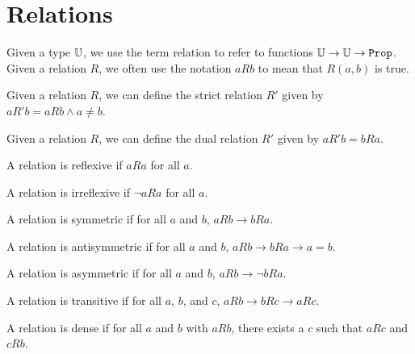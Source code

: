 \documentclass[../math.tex]{subfiles}
\begin{document}
\section{Relations}

\begin{definition}
    Given a type $\mathbb{U}$, we use the term relation to refer to functions $\U
    \rightarrow \U \rightarrow \vtt{Prop}$.  Given a relation $R$, we often use
    the notation $aRb$ to mean that $R(a, b)$ is true.
\end{definition}

\begin{definition}
    Given a relation $R$, we can define the strict relation $R'$ given by $aR'b
    = aRb \wedge a \neq b$.
\end{definition}

\begin{definition}
    Given a relation $R$, we can define the dual relation $R'$ given by $aR'b =
    bRa$.
\end{definition}

\begin{class}
    A relation is reflexive if $aRa$ for all $a$.
\end{class}

\begin{class}
    A relation is irreflexive if $\neg aRa$ for all $a$.
\end{class}

\begin{class}
    A relation is symmetric if for all $a$ and $b$, $aRb \rightarrow bRa$.
\end{class}

\begin{class}
    A relation is antisymmetric if for all $a$ and $b$, $aRb \rightarrow bRa
    \rightarrow a = b$.
\end{class}

\begin{class}
    A relation is asymmetric if for all $a$ and $b$, $aRb \rightarrow \neg bRa$.
\end{class}

\begin{class}
    A relation is transitive if for all $a$, $b$, and $c$, $aRb \rightarrow bRc
    \rightarrow aRc$.
\end{class}

\begin{class}
    A relation is dense if for all $a$ and $b$ with $aRb$, there exists a $c$
    such that $aRc$ and $cRb$.
\end{class}
\end{document}
